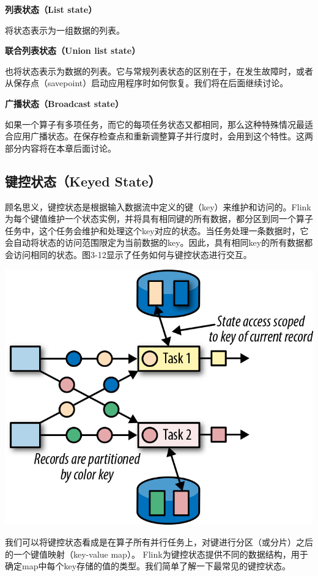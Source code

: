\documentclass[oneside]{ctexbook}
\begin{document}
\textbf{列表状态（List state）}

将状态表示为一组数据的列表。

\textbf{联合列表状态（Union list state）}

也将状态表示为数据的列表。它与常规列表状态的区别在于，在发生故障时，或者从保存点（savepoint）启动应用程序时如何恢复。我们将在后面继续讨论。

\textbf{广播状态（Broadcast state）}

如果一个算子有多项任务，而它的每项任务状态又都相同，那么这种特殊情况最适合应用广播状态。在保存检查点和重新调整算子并行度时，会用到这个特性。这两部分内容将在本章后面讨论。

\subsection{键控状态（Keyed State）}

顾名思义，键控状态是根据输入数据流中定义的键（key）来维护和访问的。Flink为每个键值维护一个状态实例，并将具有相同键的所有数据，都分区到同一个算子任务中，这个任务会维护和处理这个key对应的状态。当任务处理一条数据时，它会自动将状态的访问范围限定为当前数据的key。因此，具有相同key的所有数据都会访问相同的状态。图3-12显示了任务如何与键控状态进行交互。

\noindent \includegraphics[width=\textwidth]{spaf_0312.png}

我们可以将键控状态看成是在算子所有并行任务上，对键进行分区（或分片）之后的一个键值映射（key-value map）。 Flink为键控状态提供不同的数据结构，用于确定map中每个key存储的值的类型。我们简单了解一下最常见的键控状态。
\end{document}
